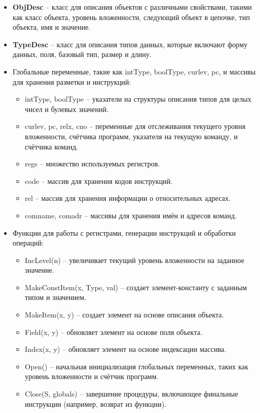 \begin{enumerate}
\begin{itemize}[label = ---]
        \item \textbf{ObjDesc} – класс для описания объектов с различными свойствами, такими как класс объекта, уровень вложенности, следующий объект в цепочке, тип объекта, имя и значение.
        \item \textbf{TypeDesc} – класс для описания типов данных, которые включают форму данных, поля, базовый тип, размер и длину.
        \item Глобальные переменные, такие как intType, boolType, curlev, pc, и массивы для хранения разметки и инструкций:
        \begin{itemize}[label = +]
            \item intType, boolType – указатели на структуры описания типов для целых чисел и булевых значений.
            \item curlev, pc, relx, cno – переменные для отслеживания текущего уровня вложенности, счётчика программ, указателя на текущую команду, и счётчика команд.
            \item regs – множество используемых регистров.
            \item code – массив для хранения кодов инструкций.
            \item rel – массив для хранения информации о относительных адресах.
            \item comname, comadr – массивы для хранения имён и адресов команд.
        \end{itemize}
        \item Функции для работы с регистрами, генерации инструкций и обработки операций:
        \begin{itemize}[label = +]
            \item IncLevel(n) – увеличивает текущий уровень вложенности на заданное значение.
            \item MakeConstItem(x, Type, val) – создает элемент-константу с заданным типом и значением.
            \item MakeItem(x, y) – создает элемент на основе описания объекта.
            \item Field(x, y) – обновляет элемент на основе поля объекта.
            \item Index(x, y) – обновляет элемент на основе индексации массива.
            \item Open() – начальная инициализация глобальных переменных, таких как уровень вложенности и счётчик программ.
            \item Close(S, globals) – завершение процедуры, включающее финальные инструкции (например, возврат из функции).

\end{itemize}
\end{itemize}
\end{enumerate}
